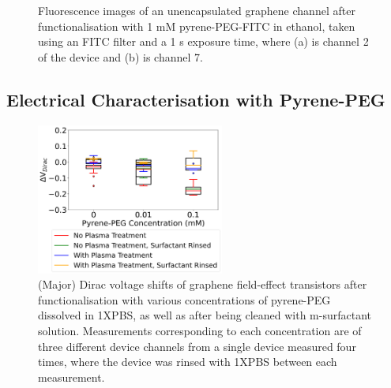 \documentclass[
  a4paper,
]{scrbook}
\begin{document}
\begin{figure}
\begin{minipage}[t]{0.47\linewidth}
{{}

}

\subcaption{\label{fig-FITC-EtOH-ch7}}
\end{minipage}%

\caption{\label{fig-FITC-EtOH}Fluorescence images of an unencapsulated
graphene channel after functionalisation with 1 mM pyrene-PEG-FITC in
ethanol, taken using an FITC filter and a 1 s exposure time, where (a)
is channel 2 of the device and (b) is channel 7.}

\end{figure}

\hypertarget{electrical-characterisation-with-pyrene-peg}{%
\subsection{Electrical Characterisation with
Pyrene-PEG}\label{electrical-characterisation-with-pyrene-peg}}

\begin{figure}

{\centering \includegraphics[width=0.55\textwidth,height=\textheight]{figures/ch6/Dirac_shift_comparisons_mPEGpyrene.png}

}

\caption{\label{fig-pypeg-dirac-shift}(Major) Dirac voltage shifts of
graphene field-effect transistors after functionalisation with various
concentrations of pyrene-PEG dissolved in 1XPBS, as well as after being
cleaned with m-surfactant solution. Measurements corresponding to each
concentration are of three different device channels from a single
device measured four times, where the device was rinsed with 1XPBS
between each measurement.}

\end{figure}
\end{document}
